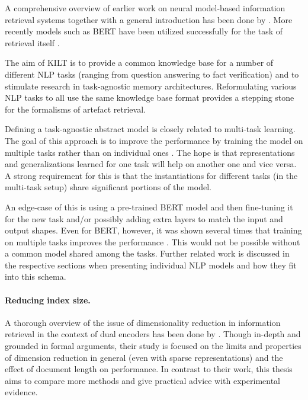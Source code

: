 A comprehensive overview of earlier work on neural model-based information retrieval systems together with a general introduction has been done by \citet{mitra2017neural}.
More recently models such as BERT have been utilized successfully for the task of retrieval itself \citep{nogueira2019multi, soleimani2020bert}.

The aim of KILT \cite{petroni2021kilt} is to provide a common knowledge base for a number of different NLP tasks (ranging from question answering to fact verification) and to stimulate research in task-agnostic memory architectures. Reformulating various NLP tasks to all use the same knowledge base format provides a stepping stone for the formalisms of artefact retrieval.

Defining a task-agnostic abstract model is closely related to multi-task learning.
The goal of this approach is to improve the performance by training the model on multiple tasks rather than on individual ones \citep{maillard-etal-2021-multi}.
The hope is that representations and generalizations learned for one task will help on another one and vice versa. A strong requirement for this is that the instantiations for different tasks (in the multi-task setup) share significant portions of the model.

An edge-case of this is using a pre-trained BERT model and then fine-tuning it for the new task and/or possibly adding extra layers to match the input and output shapes. Even for BERT, however, it was shown several times \cite{petroni2021kilt,liu2019multi,sun2019fine,kim2019qe} that training on multiple tasks improves the performance \citep{aghajanyan2021muppet}.
This would not be possible without a common model shared among the tasks.
Further related work is discussed in the respective sections when presenting individual NLP models and how they fit into this schema.

\paragraph{Reducing index size.}

A thorough overview of the issue of dimensionality reduction in information retrieval in the context of dual encoders has been done by \citet{luan2020sparse}.
Though in-depth and grounded in formal arguments, their study is focused on the limits and properties of dimension reduction in general (even with sparse representations) and the effect of document length on performance.
In contrast to their work, this thesis aims to compare more methods and give practical advice with experimental evidence.

